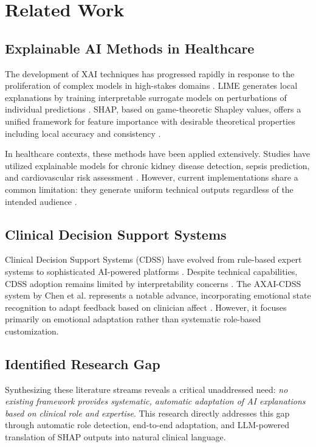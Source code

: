 \documentclass{ieeeaccess}
\begin{document}
\section{Related Work}
\label{sec:related}

\subsection{Explainable AI Methods in Healthcare}

The development of XAI techniques has progressed rapidly in response to the proliferation of complex models in high-stakes domains \cite{web12, web16}. LIME generates local explanations by training interpretable surrogate models on perturbations of individual predictions \cite{web13, web15}. SHAP, based on game-theoretic Shapley values, offers a unified framework for feature importance with desirable theoretical properties including local accuracy and consistency \cite{web15, web16}.

In healthcare contexts, these methods have been applied extensively. Studies have utilized explainable models for chronic kidney disease detection, sepsis prediction, and cardiovascular risk assessment \cite{web4, web9}. However, current implementations share a common limitation: they generate uniform technical outputs regardless of the intended audience \cite{web10}.

\subsection{Clinical Decision Support Systems}

Clinical Decision Support Systems (CDSS) have evolved from rule-based expert systems to sophisticated AI-powered platforms \cite{web3, web9}. Despite technical capabilities, CDSS adoption remains limited by interpretability concerns \cite{web5, web9}. The AXAI-CDSS system by Chen et al. represents a notable advance, incorporating emotional state recognition to adapt feedback based on clinician affect \cite{web7}. However, it focuses primarily on emotional adaptation rather than systematic role-based customization.

\subsection{Identified Research Gap}

Synthesizing these literature streams reveals a critical unaddressed need: \textit{no existing framework provides systematic, automatic adaptation of AI explanations based on clinical role and expertise}. This research directly addresses this gap through automatic role detection, end-to-end adaptation, and LLM-powered translation of SHAP outputs into natural clinical language.
\end{document}
